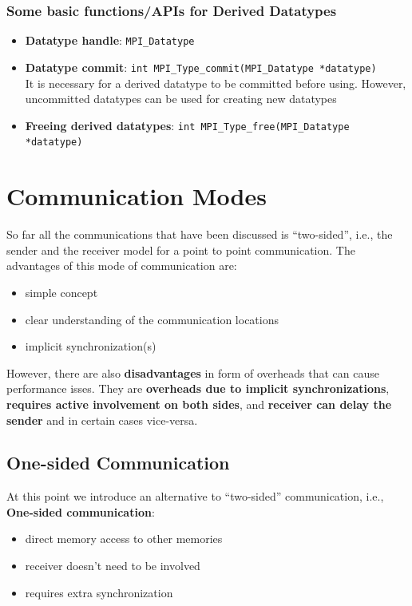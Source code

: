 \documentclass[12pt, a4paper]{report}
\begin{document}
\subsubsection{Some basic functions/APIs for Derived Datatypes}
\begin{itemize}
    \item {\bfseries{Datatype handle}}: \verb$MPI_Datatype$
    \item {\bfseries{Datatype commit}}: \verb$int MPI_Type_commit(MPI_Datatype *datatype)$\\
          It is necessary for a derived datatype to be committed before using. However, uncommitted datatypes can be used for creating new datatypes
    \item {\bfseries{Freeing derived datatypes}}: \verb$int MPI_Type_free(MPI_Datatype *datatype)$
\end{itemize}

\section{Communication Modes}
So far all the communications that have been discussed is ``two-sided'', i.e., the sender and the receiver model for a point to point communication. The 
advantages of this mode of communication are:
\begin{itemize}
    \item simple concept
    \item clear understanding of the communication locations
    \item implicit synchronization(s)
\end{itemize}
However, there are also {\bfseries{disadvantages}} in form of overheads that can cause performance isses. They are 
{\bfseries{overheads due to implicit synchronizations}}, {\bfseries{requires active involvement on both sides}}, and {\bfseries{receiver can delay the sender}}
and in certain cases vice-versa.\\

\subsection{One-sided Communication}
At this point we introduce an alternative to ``two-sided'' communication, i.e., {\bfseries{One-sided communication}}:
\begin{itemize}
    \item direct memory access to other memories
    \item receiver doesn't need to be involved
    \item requires extra synchronization
\end{itemize}
\end{document}
